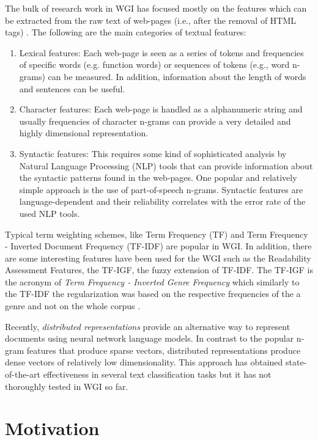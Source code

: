 The bulk of research work in WGI has focused mostly on the features which can be extracted from the raw text of web-pages (i.e., after the removal of HTML tags) \parencite{mason2009classifying,sharoff2010web,Sharroff2010,Nooralahzadeh2014,onan2018ensemble}. The following are the main categories of textual features: 

\begin{enumerate}
\item Lexical features: Each web-page is seen as a series of tokens and frequencies of specific words (e.g. function words) or sequences of tokens (e.g., word n-grams) can be measured. In addition, information about the length of words and sentences can be useful.
\item Character features: Each web-page is handled as a alphanumeric string and usually frequencies of character n-grams can provide a very detailed and highly dimensional representation. 
\item Syntactic features: This requires some kind of sophisticated analysis by Natural Language Processing (NLP) tools that can provide information about the syntactic patterns found in the web-pages. One popular and relatively simple approach is the use of part-of-speech n-grams. Syntactic features are language-dependent and their reliability correlates with the error rate of the used NLP tools.
\end{enumerate}

Typical term weighting schemes, like Term Frequency (TF) and Term Frequency - Inverted Document Frequency (TF-IDF) are popular in WGI. In addition, there are some interesting features have been used for the WGI such as the Readability Assessment Features, the TF-IGF, the fuzzy extension of TF-IDF. The TF-IGF is the acronym of \textit{Term Frequency - Inverted Genre Frequency} which similarly to the TF-IDF the regularization was based on the respective frequencies of the a genre and not on the whole corpus \parencite{sugiyanto2014term,}.

Recently, \textit{distributed representations} provide an alternative way to represent documents using neural network language models. In contrast to the popular n-gram features that produce sparse vectors, distributed representations produce dense vectors of relatively low dimensionality. This approach has obtained state-of-the-art effectiveness in several text classification tasks but it has not thoroughly tested in WGI so far. 

\section{Motivation} 
\label{chap:introduction:sec:motivation_objective}

